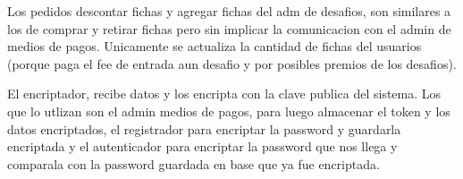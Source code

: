 Los pedidos descontar fichas y agregar fichas del adm de desafios, son similares a los de comprar y retirar fichas pero sin implicar la comunicacion con el admin de medios de pagos. Unicamente se actualiza la cantidad de fichas del usuarios (porque paga el fee de entrada  aun desafio y por posibles premios de los desafios).

El encriptador, recibe datos y los encripta con la clave publica del sistema. Los que lo utlizan son el admin medios de pagos, para luego almacenar el token y los datos encriptados, el registrador para encriptar la password y guardarla encriptada y el autenticador para encriptar la password que nos llega y comparala con la password guardada en base que ya fue encriptada.
